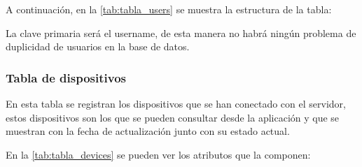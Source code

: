 A continuación, en la \autoref{tab:tabla_users} se muestra la estructura de la tabla:
\begin{table}[H]
	\centering
	\caption{Tabla users BBDD}
	\label{tab:tabla_users}
\end{table}
La clave primaria será el username, de esta manera no habrá ningún problema de duplicidad de usuarios en la base de datos.

\subsubsection{Tabla de dispositivos}
En esta tabla se registran los dispositivos que se han conectado con el servidor, estos dispositivos son los que se pueden consultar desde la aplicación y que se muestran con la fecha de actualización junto con su estado actual.

En la \autoref{tab:tabla_devices} se pueden ver los atributos que la componen:

